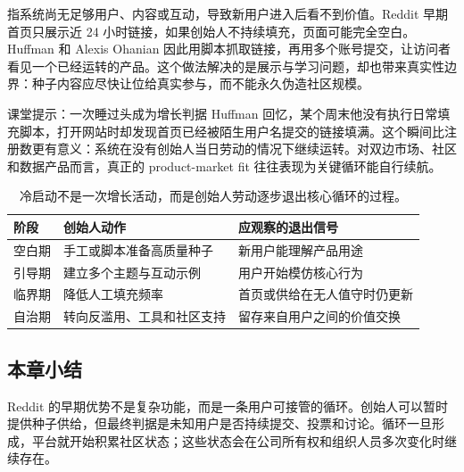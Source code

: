  指系统尚无足够用户、内容或互动，导致新用户进入后看不到价值。Reddit 早期首页只展示近 24 小时链接，如果创始人不持续填充，页面可能完全空白。Huffman 和 Alexis Ohanian 因此用脚本抓取链接，再用多个账号提交，让访问者看见一个已经运转的产品。这个做法解决的是展示与学习问题，却也带来真实性边界：种子内容应尽快让位给真实参与，而不能永久伪造社区规模。

\begin{knowledgebox}{课堂提示：一次睡过头成为增长判据}
Huffman 回忆，某个周末他没有执行日常填充脚本，打开网站时却发现首页已经被陌生用户名提交的链接填满。这个瞬间比注册数更有意义：系统在没有创始人当日劳动的情况下继续运转。对双边市场、社区和数据产品而言，真正的 product-market fit 往往表现为关键循环能自行续航。
\end{knowledgebox}

\begin{table}[H]
\centering
\begin{tabular}{L{0.2\textwidth}L{0.31\textwidth}L{0.39\textwidth}}
\toprule
阶段 & 创始人动作 & 应观察的退出信号 \\
\midrule
空白期 & 手工或脚本准备高质量种子 & 新用户能理解产品用途 \\
引导期 & 建立多个主题与互动示例 & 用户开始模仿核心行为 \\
临界期 & 降低人工填充频率 & 首页或供给在无人值守时仍更新 \\
自治期 & 转向反滥用、工具和社区支持 & 留存来自用户之间的价值交换 \\
\bottomrule
\end{tabular}
\caption{冷启动不是一次增长活动，而是创始人劳动逐步退出核心循环的过程。}
\end{table}

\subsection{本章小结}

Reddit 的早期优势不是复杂功能，而是一条用户可接管的循环。创始人可以暂时提供种子供给，但最终判据是未知用户是否持续提交、投票和讨论。循环一旦形成，平台就开始积累社区状态；这些状态会在公司所有权和组织人员多次变化时继续存在。

